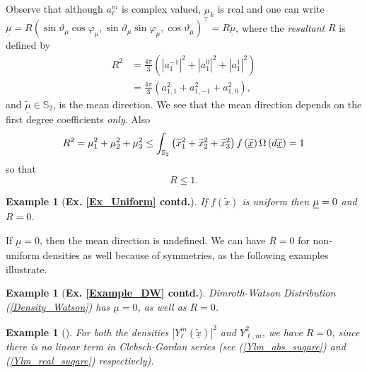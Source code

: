 \documentclass[preprint,11pt,a4paper]{elsarticle}
\newtheorem{example}[theorem]{Example}
\begin{document}
Observe that although $a_{\ell}^{m}$ is complex valued, $\mu_{k}$ is real
and one can write\newline
$\underline{\mu}=R\left( \sin\vartheta_{\mu}\cos
\varphi_{\mu},\sin\vartheta_{\mu}\sin\varphi_{\mu},\cos\vartheta_{\mu}%
\right) ^{\top}=R\widetilde{\underline{\mu}}$, where the \emph{resultant} $R$
is defined by 
\begin{align*}
R^{2} & =\frac{4\pi}{3}\left( \left\vert a_{1}^{-1}\right\vert
^{2}+\left\vert a_{1}^{0}\right\vert ^{2}+\left\vert a_{1}^{1}\right\vert
^{2}\right) \\
& =\frac{4\pi}{3}\left( a_{1,1}^{2}+a_{1,-1}^{2}+a_{1,0}^{2}\right) ,
\end{align*}
and $\widetilde{\underline{\mu}}\in\mathbb{S}_{2}$, is the mean direction.
We see that the mean direction depends on the first degree coefficients 
\textit{only}. Also 
\begin{equation*}
R^{2}=\mu_{1}^{2}+\mu_{2}^{2}+\mu_{3}^{2}\leq\int_{\mathbb{S}_{2}}\left( 
\widetilde{x}_{1}^{2}+\widetilde{x}_{2}^{2}+\widetilde{x}_{3}^{2}\right)
f\left( \underline{\widetilde{x}}\right) \Omega\left( d\underline{\widetilde{%
x}}\right) =1
\end{equation*}
so that 
\begin{equation*}
R\leq1.
\end{equation*}

\begin{example}[\textbf{Ex. \protect\ref{Ex_Uniform} contd.}]
If $f\left( \underline{\widetilde{x}}\right) $ is uniform then $\underline{%
\mu}=0$ and $R=0$.
\end{example}

If $\underline{\mu}=0$, then the mean direction is undefined. We can have $%
R=0$ for non-uniform densities as well because of symmetries, as the
following examples illustrate.

\begin{example}[\textbf{Ex. \protect\ref{Example_DW} contd.}]
Dimroth-Watson Distribution (\ref{Density_Watson}) has $\underline{\mu}=0$,
as well as $R=0$.
\end{example}

\begin{example}[\textbf{Ex. \protect\ref{EX_Ylm_compl_suqare}, \protect\ref%
{EX_Ylm_real_suqare} contd.}]
For both the densities $\left\vert Y_{\ell}^{m}\left( \underline{\widetilde{x%
}}\right) \right\vert ^{2}$ and $Y_{\ell,m}^{2}$, we have $R=0$, since there
is no linear term in Clebsch-Gordan series 
(see (\ref{Ylm_abs_suqare}) and (\ref{Ylm_real_suqare}) respectively).
\end{example}
\end{document}
